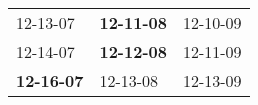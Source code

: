 \begin{supertabular}{p{0.33\columnwidth}p{0.33\columnwidth}p{0.33\columnwidth}}
          12-13-07\textsuperscript{} &  \textbf{12-11-08\textsuperscript{}} &  12-10-09\textsuperscript{} \\
          12-14-07\textsuperscript{} &  \textbf{12-12-08\textsuperscript{}} &  12-11-09\textsuperscript{} \\
 \textbf{12-16-07\textsuperscript{}} &           12-13-08\textsuperscript{} &  12-13-09\textsuperscript{} \\
\end{supertabular}
